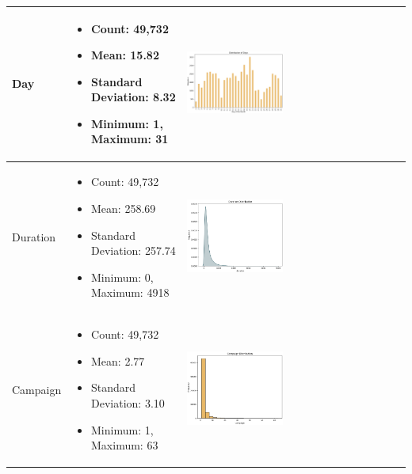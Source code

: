 \documentclass{article}
\begin{document}
\begin{longtable}{|p{}|p{}|p{}|}
    \hline
    Day & 
    \begin{itemize}
        \item Count: 49,732
        \item Mean: 15.82
        \item Standard Deviation: 8.32
        \item Minimum: 1, Maximum: 31
    \end{itemize} & 
    \includegraphics[width=0.45\textwidth]{data/bank_marketing/pic/Bank_day.png} \\
    \hline
    Duration & 
    \begin{itemize}
        \item Count: 49,732
        \item Mean: 258.69
        \item Standard Deviation: 257.74
        \item Minimum: 0, Maximum: 4918
    \end{itemize} & 
    \includegraphics[width=0.45\textwidth]{data/bank_marketing/pic/Bank_duration.png} \\
    \hline
    Campaign & 
    \begin{itemize}
        \item Count: 49,732
        \item Mean: 2.77
        \item Standard Deviation: 3.10
        \item Minimum: 1, Maximum: 63
    \end{itemize} & 
    \includegraphics[width=0.45\textwidth]{data/bank_marketing/pic/Bank_campaign.png} \\

\end{longtable}
\end{document}
